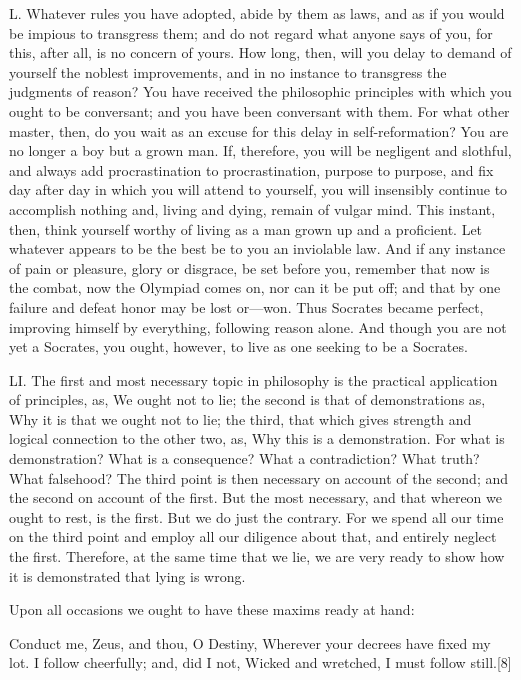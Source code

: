 \documentclass[a4paper]{article}
\begin{document}
L. Whatever rules you have adopted, abide by them as laws, and as if you
would be impious to transgress them; and do not regard what anyone says
of you, for this, after all, is no concern of yours. How long, then, will
you delay to demand of yourself the noblest improvements, and in no
instance to transgress the judgments of reason? You have received the
philosophic principles with which you ought to be conversant; and you
have been conversant with them. For what other master, then, do you wait
as an excuse for this delay in self-reformation? You are no longer a boy
but a grown man. If, therefore, you will be negligent and slothful, and
always add procrastination to procrastination, purpose to purpose, and
fix day after day in which you will attend to yourself, you will
insensibly continue to accomplish nothing and, living and dying, remain
of vulgar mind. This instant, then, think yourself worthy of living as a
man grown up and a proficient. Let whatever appears to be the best be to
you an inviolable law. And if any instance of pain or pleasure, glory or
disgrace, be set before you, remember that now is the combat, now the
Olympiad comes on, nor can it be put off; and that by one failure and
defeat honor may be lost or—won. Thus Socrates became perfect, improving
himself by everything, following reason alone. And though you are not yet
a Socrates, you ought, however, to live as one seeking to be a Socrates.


LI. The first and most necessary topic in philosophy is the practical
application of principles, as, We ought not to lie; the second is that
of demonstrations as, Why it is that we ought not to lie; the third,
that which gives strength and logical connection to the other two, as,
Why this is a demonstration. For what is demonstration? What is a
consequence? What a contradiction? What truth? What falsehood? The third
point is then necessary on account of the second; and the second on
account of the first. But the most necessary, and that whereon we ought
to rest, is the first. But we do just the contrary. For we spend all our
time on the third point and employ all our diligence about that, and
entirely neglect the first. Therefore, at the same time that we lie, we
are very ready to show how it is demonstrated that lying is wrong.

Upon all occasions we ought to have these maxims ready at hand:

  Conduct me, Zeus, and thou, O Destiny,
  Wherever your decrees have fixed my lot.
  I follow cheerfully; and, did I not,
  Wicked and wretched, I must follow still.[8]
\end{document}
